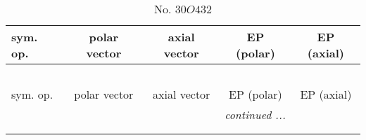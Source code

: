 \documentclass[fleqn,10pt,landscape]{jsarticle}
\begin{document}
\newpage
\begin{center}
\renewcommand{\arraystretch}{1.3}
\begin{longtable}{lcccc}
\caption{No. 30\quad$O$\quad$432$\quad[ cubic ]}
 \\
 \hline \hline
sym. op. & polar vector & axial vector & EP (polar) & EP (axial) \\ \hline \endfirsthead

\multicolumn{4}{l}{\tablename\ \thetable{}} \\
 \hline \hline
sym. op. & polar vector & axial vector & EP (polar) & EP (axial) \\ \hline \endhead

 \hline \hline
\multicolumn{4}{r}{\footnotesize\it continued ...} \\ \endfoot

 \hline \hline
\multicolumn{4}{r}{} \\ \endlastfoot


\end{longtable}
\end{center}
\end{document}
